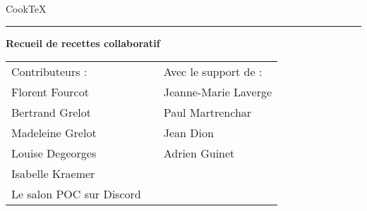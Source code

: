 \thispagestyle{empty}

\newenvironment{vcenterpage}
{\newpage\vspace*{\fill}}
{\vspace*{\fill}\par\pagebreak}
\def\thickhrulefill{\leavevmode \leaders \hrule height 1pt\hfill \kern \z@}



\begin{titlepage}
\begin{tabular}{p{10cm}p{5cm}}
\end{tabular}    
\vspace*{1.5cm}

\begin{flushleft}
\huge Cook\TeX
\end{flushleft}
\par
\hrule height 4pt
\par
\begin{flushright}
\textcolor[gray]{0.5}{\LARGE \textbf{Recueil de recettes collaboratif}}
\end{flushright}

\vspace*{9cm}

\begin{center}
\begin{tabular}{lp{3cm}l}
\textcolor[gray]{0.4}{\large Contributeurs :} & & \textcolor[gray]{0.4}{\large Avec le support de :}\\
Florent Fourcot & & Jeanne-Marie Laverge\\
Bertrand Grelot & & Paul Martrenchar\\
Madeleine Grelot & & Jean Dion\\
Louise Degeorges & & Adrien Guinet\\
Isabelle Kraemer & & \\
Le salon POC sur Discord & & \\
\end{tabular}
\end{center}

\end{titlepage}


